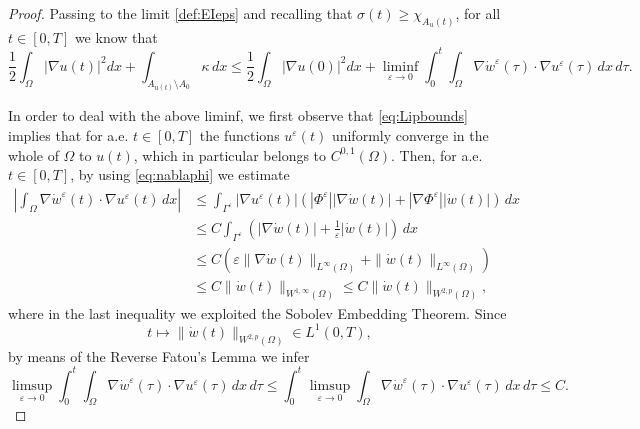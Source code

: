 \documentclass[a4paper,11pt,reqno]{amsart}
\numberwithin{equation}{section}
\theoremstyle{definition}
\theoremstyle{remark}
\begin{document}
\begin{proof}
    Passing to the limit \ref{def:EIeps} and recalling that $\sigma(t)\ge \chi_{A_u(t)}$, for all $t\in [0,T]$ we know that
    \begin{equation}\label{eq:ei}
        \frac 12 \int_\Omega |\nabla u(t)|^2 dx+\int_{A_{u(t)}\setminus A_{0}}\kappa\,d x \le  \frac 12 \int_\Omega |\nabla u(0)|^2 dx+\liminf\limits_{\varepsilon \to 0}\int_0^t \int_\Omega \nabla \dot w^\varepsilon(\tau)\cdot \nabla u^\varepsilon(\tau) \, dx\, d\tau.
    \end{equation}

    In order to deal with the above liminf, we first observe that \eqref{eq:Lipbounds} implies that for a.e. $t\in [0,T]$ the functions $u^\varepsilon (t)$ uniformly converge in the whole of $\Omega$ to $u(t)$, which in particular belongs to $C^{0,1}(\Omega)$. Then, for a.e. $t\in [0,T]$, by using \eqref{eq:nablaphi} we estimate
    \begin{equation}\label{eq:L1bound}
    \begin{aligned}
        \left|\int_\Omega \nabla \dot w^\varepsilon(t)\cdot \nabla u^\varepsilon(t) \, dx\right|&\le \int_{\Gamma^\varepsilon} |\nabla u^\varepsilon (t)|\left(|\Phi^\varepsilon||\nabla \dot w(t)|{+}|\nabla \Phi^\varepsilon||\dot w(t)|\right)\, dx\\
        &\le C\int_{\Gamma^\varepsilon}\left(|\nabla \dot w(t)|+\frac 1\varepsilon|\dot w(t)|\right) \, dx
        \\&\le C\left(\varepsilon \|\nabla \dot w(t)\|_{L^\infty(\Omega)}{+}\| \dot w(t)\|_{L^\infty(\Omega)}\right)\\
        &\le C  \| \dot w(t)\|_{W^{1,\infty}(\Omega)}\le C  \| \dot w(t)\|_{W^{2,p}(\Omega)},
    \end{aligned}         
    \end{equation}
    where in the last inequality we exploited the Sobolev Embedding Theorem. Since
    \begin{equation}
        t\mapsto\| \dot w(t)\|_{W^{2,p}(\Omega)}\in L^1(0,T),
    \end{equation}
    by means of the Reverse Fatou's Lemma we infer
    \begin{equation}\label{eq:revFatou}
        \limsup\limits_{\varepsilon \to 0}\int_0^t \int_\Omega \nabla \dot w^\varepsilon(\tau)\cdot \nabla u^\varepsilon(\tau) \, dx\, d\tau\le \int_0^t  \limsup\limits_{\varepsilon \to 0}\int_\Omega \nabla \dot w^\varepsilon(\tau)\cdot \nabla u^\varepsilon(\tau) \, dx \,d\tau\leq C.
    \end{equation}

\end{proof}
\end{document}
